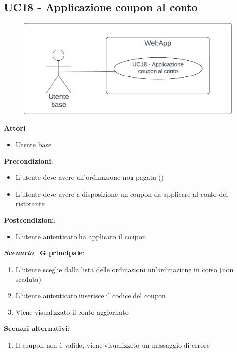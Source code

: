 \subsection{UC18 - Applicazione coupon al conto} \label{usecase:18}
\begin{figure}[H]
    \centering
    \includegraphics[width=0.9\linewidth]{ucd/ucd18.png}
\end{figure}
\textbf{Attori}:
\begin{itemize}
    \item Utente base
\end{itemize}
\textbf{Precondizioni}:
\begin{itemize}
    \item L'utente deve avere un'ordinazione non pagata ()
    \item L'utente deve avere a disposizione un coupon da applicare al conto del ristorante
\end{itemize}
\textbf{Postcondizioni}:
\begin{itemize}
    \item L'utente autenticato ha applicato il coupon
\end{itemize}
\textbf{\textit{Scenario}_G principale}:
\begin{enumerate}
    \item L'utente sceglie dalla lista delle ordinazioni un'ordinazione in corso (non scaduta)
    \item L'utente autenticato inserisce il codice del coupon
    \item Viene visualizzato il conto aggiornato
\end{enumerate}
\textbf{Scenari alternativi}:
\begin{enumerate}
    \item Il coupon non è valido, viene visualizzato un messaggio di errore
\end{enumerate}
\newpage